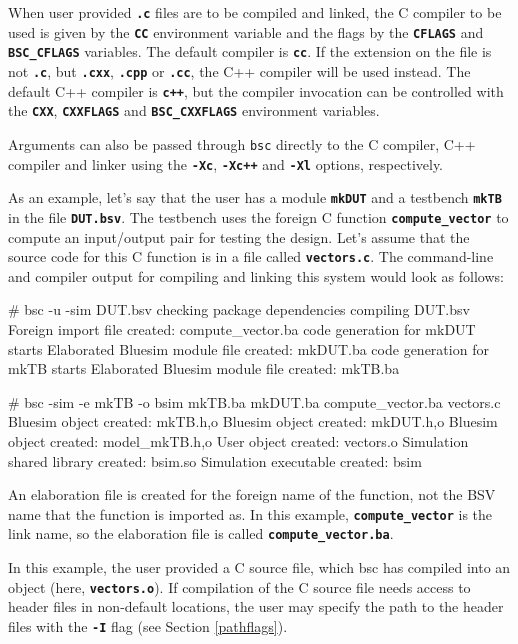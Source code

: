\documentclass{article}
\newcommand{\te}[1]{\texttt{#1}}
\newenvironment{centerboxverbatim}
  {\center
   \boxedverbatim}
  {\endboxedverbatim
  {\endcenter }}
\begin{document}
When user provided {\bf\tt .c} files are to
be compiled and linked, the C compiler to be used is given by the
{\bf\tt CC} environment variable and the flags by the {\bf\tt CFLAGS}
and {\bf\tt BSC\_CFLAGS} variables.
The default compiler is {\bf\tt cc}.  If the extension on
the file is not {\bf\tt .c}, but {\bf\tt .cxx}, {\bf\tt .cpp} or
{\bf\tt .cc}, the C++ compiler will be used instead.
The default C++ compiler is {\bf\tt c++}, but the
compiler invocation can be controlled with the {\bf\tt CXX},
{\bf\tt CXXFLAGS} and {\bf\tt BSC\_CXXFLAGS} environment variables.

Arguments can also be passed through {\tt bsc} directly to the C
compiler, C++ compiler and linker using the {\tt\bf -Xc},
 {\tt\bf -Xc++} and {\tt\bf -Xl} options, respectively.

As an example, let's say that the user has a module {\bf\tt mkDUT}
and a testbench {\bf\tt mkTB} in the file {\bf\tt DUT.bsv}.  The testbench
uses the foreign C function {\bf\tt compute\_vector} to compute an
input/output pair for testing the design.  Let's assume that the
source code for this C function is in a file called {\bf\tt vectors.c}.
The command-line and compiler output for compiling and linking this system
would look as follows:

\begin{centerboxverbatim}
# bsc -u -sim DUT.bsv
checking package dependencies
compiling DUT.bsv
Foreign import file created: compute_vector.ba
code generation for mkDUT starts
Elaborated Bluesim module file created: mkDUT.ba
code generation for mkTB starts
Elaborated Bluesim module file created: mkTB.ba

# bsc -sim -e mkTB -o bsim mkTB.ba mkDUT.ba compute_vector.ba vectors.c
Bluesim object created: mkTB.{h,o}
Bluesim object created: mkDUT.{h,o}
Bluesim object created: model_mkTB.{h,o}
User object created: vectors.o
Simulation shared library created: bsim.so
Simulation executable created: bsim
\end{centerboxverbatim}

An elaboration file is created for the foreign name of the function,
not the BSV name that the function is imported as.  In this example,
{\bf\tt compute\_vector} is the link name, so the elaboration file is
called {\bf\tt compute\_vector.ba}.

In this example, the user provided a C source file, which bsc has compiled
into an object (here, {\bf\tt vectors.o}).  If compilation of the C
source file needs access to header files in non-default locations,
the user may specify the path to the header files with the {\bf\tt -I}
flag (see Section \ref{pathflags}).\index{-I@\te{-I} (compiler flag)}
\end{document}
